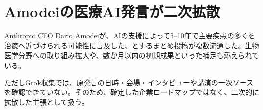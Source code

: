 \section{Amodeiの医療AI発言が二次拡散}
Anthropic CEO Dario Amodeiが、AIの支援によって5--10年で主要疾患の多くを治癒へ近づけられる可能性に言及した、とするまとめ投稿が複数流通した。生物医学分野への取り組み拡大や、数か月以内の初期成果といった補足も添えられている。

ただしGrok収集では、原発言の日時・会場・インタビューや講演の一次ソースを確認できていない。そのため、確定した企業ロードマップではなく、二次的に拡散した主張として扱う。
